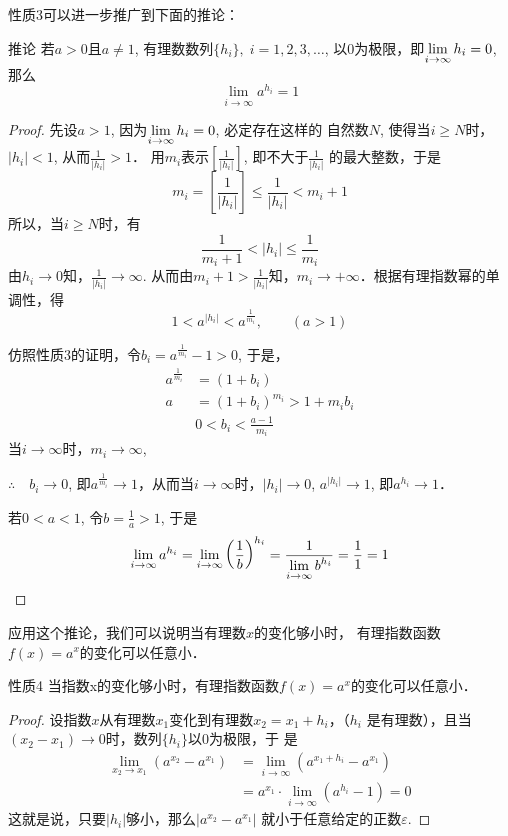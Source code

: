 性质3可以进一步推广到下面的推论：

\begin{blk}{推论}
   若$a>0$且$a\ne 1$, 有理数数列$\{h_i\},\; i=1,2,3,\ldots$,
以0为极限，即$\displaystyle\lim_{i\to\infty}h_i=0$, 那么
\[\lim_{i\to\infty}a^{h_i}=1\]
\end{blk}

\begin{proof}
  先设$a>1$, 因为$\displaystyle\lim_{i\to\infty}h_i=0$, 必定存在这样的
自然数$N$, 使得当$i\ge N$时，$|h_i|<1$, 从而$\frac{1}{|h_i|}>1$．
用$m_i$表示$\left[\frac{1}{|h_i|}\right]$,
即不大于$\frac{1}{|h_i|}$
的最大整数，于是
\begin{equation}
  m_i=\left[\frac{1}{|h_i|}\right]\le \frac{1}{|h_i|}<m_i+1
\end{equation}
所以，当$i\ge N$时，有
\[\frac{1}{m_i+1}<|h_i|\le\frac{1}{m_i}\]
由$h_i\to 0$知，$\frac{1}{|h_i|}\to \infty$. 从而由$m_i+1>\frac{1}{|h_i|}$知，$m_i\to +\infty$．根据有理指数幂的单调性，得
\[1<a^{|h_i|}<a^{\tfrac{1}{m_i}},\qquad (a>1)\]

仿照性质3的证明，令$b_i=a^{\tfrac{1}{m_i}}-1>0$, 于是，
\[\begin{split}
  a^{\tfrac{1}{m_i}}&=(1+b_i)\\
  a&=(1+b_i)^{m_i}>1+m_ib_i\\
  & 0<b_i<\frac{a-1}{m_i}
\end{split}\]
当$i\to \infty$时，$m_i\to \infty$,

$\therefore\quad b_i\to 0$, 即$a^{\tfrac{1}{m_i}}\to 1$，从而当$i\to \infty$时，$|h_i|\to 0$, $a^{|h_i|}\to 1$, 即$a^{h_i}\to 1$．

若$0<a<1$, 令$b=\frac{1}{a}>1$, 于是
\[\lim_{i\to \infty} a^{h_i}=\lim_{i\to \infty} \left(\dfrac{1}{b}\right)^{h_i}=\dfrac{1}{\displaystyle\lim_{i\to \infty} b^{h_i}}=\dfrac{1}{1}=1\]
\end{proof}

应用这个推论，我们可以说明当有理数$x$的变化够小时，
有理指数函数$f(x)=a^x$的变化可以任意小．

\begin{blk}{性质4}
   当指数x的变化够小时，有理指数函数$f(x)=
a^x$的变化可以任意小．
\end{blk}

\begin{proof}
  设指数$x$从有理数$x_1$变化到有理数$x_2=x_1+h_i$，（$h_i$
是有理数），且当$(x_2-x_1)\to 0$时，数列$\{h_i\}$以0为极限，于
是
\[\begin{split}
  \lim_{x_2\to x_1}\left(a^{x_2}-a^{x_1}\right)&=\lim_{i\to \infty}\left(a^{x_1+h_i}-a^{x_1}\right)\\
  &=a^{x_1}\cdot \lim_{i\to \infty}\left(a^{h_i}-1\right)=0
\end{split}\]
这就是说，只要$|h_i|$够小，那么$|a^{x_2}-a^{x_1}|$
就小于任意给定的正数$\varepsilon$.
\end{proof}


